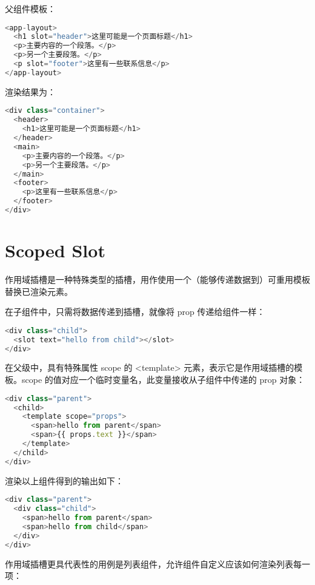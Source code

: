父组件模板：


\begin{lstlisting}[language=JavaScript]
<app-layout>
  <h1 slot="header">这里可能是一个页面标题</h1>
  <p>主要内容的一个段落。</p>
  <p>另一个主要段落。</p>
  <p slot="footer">这里有一些联系信息</p>
</app-layout>
\end{lstlisting}


渲染结果为：


\begin{lstlisting}[language=JavaScript]
<div class="container">
  <header>
    <h1>这里可能是一个页面标题</h1>
  </header>
  <main>
    <p>主要内容的一个段落。</p>
    <p>另一个主要段落。</p>
  </main>
  <footer>
    <p>这里有一些联系信息</p>
  </footer>
</div>
\end{lstlisting}


\section{Scoped Slot}

作用域插槽是一种特殊类型的插槽，用作使用一个（能够传递数据到）可重用模板替换已渲染元素。

在子组件中，只需将数据传递到插槽，就像将 prop 传递给组件一样：

\begin{lstlisting}[language=JavaScript]
<div class="child">
  <slot text="hello from child"></slot>
</div>
\end{lstlisting}

在父级中，具有特殊属性 scope 的 <template> 元素，表示它是作用域插槽的模板。scope 的值对应一个临时变量名，此变量接收从子组件中传递的 prop 对象：



\begin{lstlisting}[language=JavaScript]
<div class="parent">
  <child>
    <template scope="props">
      <span>hello from parent</span>
      <span>{{ props.text }}</span>
    </template>
  </child>
</div>
\end{lstlisting}


渲染以上组件得到的输出如下：

\begin{lstlisting}[language=JavaScript]
<div class="parent">
  <div class="child">
    <span>hello from parent</span>
    <span>hello from child</span>
  </div>
</div>
\end{lstlisting}


作用域插槽更具代表性的用例是列表组件，允许组件自定义应该如何渲染列表每一项：

